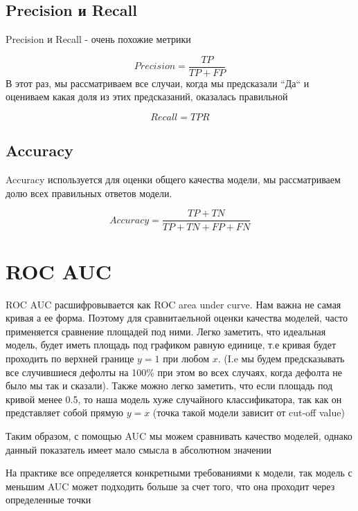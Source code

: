 \documentclass{article}
\begin{document}
        \subsection{Precision и Recall}
            Precision и Recall - очень похожие метрики

            \begin{equation}
                Precision = \dfrac{TP}{TP + FP}
            \end{equation}
            В этот раз, мы рассматриваем все случаи, когда мы предсказали ``Да`` и оцениваем какая доля из этих предсказаний, оказалась правильной

            \begin{equation}
                Recall = TPR
            \end{equation}
    
        \subsection{Accuracy}
            Accuracy используется для оценки общего качества модели,
            мы рассматриваем долю всех правильных ответов модели.


            \begin{equation}
                Accuracy = \dfrac{TP + TN}{TP + TN + FP + FN}
            \end{equation}

    \section{ROC AUC}
        ROC AUC расшифровывается как ROC area under curve. Нам важна не самая кривая а ее форма. Поэтому для сравнитаельной
        оценки качества моделей, часто применяется сравнение площадей под ними. Легко заметить, что
        идеальная модель, будет иметь площадь под графиком равную единице, т.е кривая будет проходить по верхней границе
        $y = 1$ при любом $x$. (I.e мы будем предсказывать все случившиеся дефолты на 100\% при этом во всех случаях, когда дефолта
        не было мы так и сказали). Также можно легко заметить, что если площадь под кривой менее 0.5, то наша модель хуже случайного
        классификатора, так как он представляет собой прямую $y = x$ (точка такой модели зависит от cut-off value)

        \quad

        Таким образом, с помощью AUC мы можем сравнивать качество моделей, однако данный показатель имеет мало смысла в абсолютном значении

        \quad

        На практике все определяется конкретными требованиями к модели, так модель с меньшим AUC может подходить больше за счет того, что она проходит через определенные точки
\end{document}
